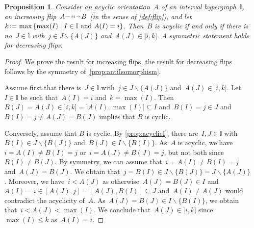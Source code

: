 \documentclass{amsart}
\newtheorem{proposition}[theorem]{Proposition}
\theoremstyle{definition}
\newcommand{\cal}[1]{\mathcal{#1}} %
\newcommand{\set}[2]{\left\{ #1 \;\middle|\; #2 \right\}} %
\newcommand{\ssm}{\smallsetminus} %
\newcommand{\eqdef}{\mbox{\,\raisebox{0.2ex}{\scriptsize\ensuremath{\mathrm:}}\ensuremath{=}\,}} %
\newcommand{\II}{\mathbb I} %
\newcommand{\cX}{\cal{X}}
\newcommand{\cY}{\cal{Y}}
\newcommand{\flip}[4]{\ensuremath{#1 \, \begin{tikzpicture}[scale=1,baseline=-.1cm] \path[->]  (0,0) edge node[fill=white,inner sep=2pt, font=\tiny ] {$#2#3$} (.7,0); \end{tikzpicture} \, #4}}
\begin{document}

\begin{proposition}
\label{prop:isFlipI}
Consider an acyclic orientation~$A$ of an interval hypergraph~$\II$, an increasing flip~$\flip{A}{i}{j}{B}$ (in the sense of \cref{def:flip}), and let~$k \eqdef \max\set{\max(I)}{I \in \II \text{ and } A(I) = i}$.
Then~$B$ is acyclic if and only if there is no~$J \in \II$ with~$j \in J \ssm \{A(J)\}$ and~$A(J) \in {]i,k]}$.
A symmetric statement holds for decreasing flips.
\end{proposition}

\begin{proof}
We prove the result for increasing flips, the result for decreasing flips follows by the symmetry of~\cref{prop:antiIsomorphism}.

Assume first that there is~$J \in \II$ with~$j \in J \ssm \{A(J)\}$ and~$A(J) \in {]i,k]}$.
Let~$I \in \II$ be such that~$A(I) = i$ and~$k = \max(I)$.
Then~$B(J) = A(J) \in {]i,k]} = {]A(I), \max(I)]} \subseteq I$ and~$B(I) = j \in J$ and~$B(I) = j \ne A(J) = B(J)$ implies that $B$ is cyclic.

Conversely, assume that $B$ is cyclic.
By \cref{prop:acyclicI}, there are~$I,J \in \II$ with~${B(I) \in J \ssm \{B(J)\}}$ and~$B(J) \in I \ssm \{B(I)\}$.
As~$A$ is acyclic, we have~$i = A(I) \ne B(I) = j$ or~$i = A(J) \ne B(J) = j$, but not both since~$B(I) \ne B(J)$.
By symmetry, we can assume that~$i = A(I) \ne B(I) = j$ and~$A(J) = B(J)$.
We obtain that~$j = B(I) \in J \ssm \{B(J)\} = J \ssm \{A(J)\}$.
Moreover, we have~$i < A(J)$ as otherwise~$A(J) = B(J) \in I$ and~$A(I) = i \in [A(J), j] = [A(J), B(I)] \subseteq J$ and~$A(I) \ne A(J)$ would contradict the acyclicity of~$A$.
As~$A(J) = B(J) \in I \ssm \{B(I)\}$, we obtain that~$i < A(J) < \max(I)$.
We conclude that~$A(J) \in {]i,k]}$ since~$\max(I) \le k$ as~$A(I) = i$.
\end{proof}
\end{document}

